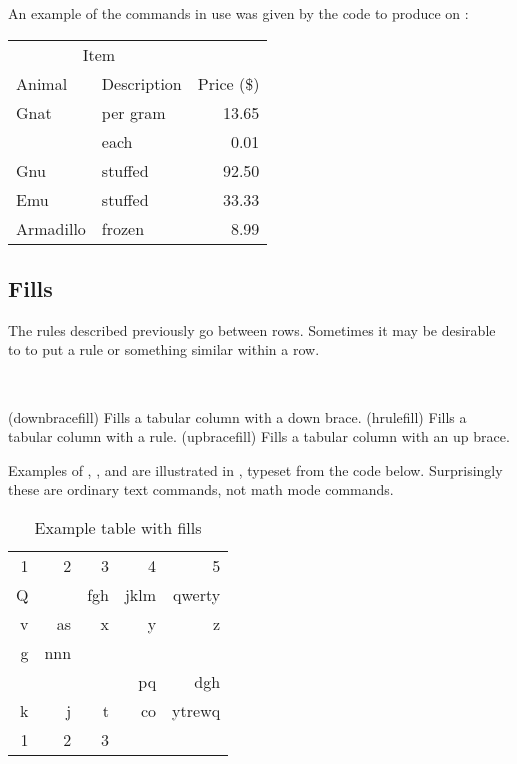  An example of the commands in use was given by the code to
 produce  on :
\begin{lcode}
\begin{tabular}{@{}llr@{}} \toprule
\multicolumn{2}{c}{Item} \\ \cmidrule(r){1-2}
Animal & Description & Price (\$)\\ \midrule
Gnat   & per gram  & 13.65 \\
       & each      & 0.01 \\
Gnu    & stuffed   & 92.50 \\
Emu    & stuffed   & 33.33 \\
Armadillo & frozen & 8.99 \\ \bottomrule
\end{tabular}
\end{lcode}


\subsection{Fills}


    The rules described previously go between rows. Sometimes it may be 
desirable to to put a rule or something similar within a 
row.
    
\begin{syntax}
\cmd{\downbracefill} \cmd{\hrulefill} \cmd{\upbracefill} \\
\end{syntax}
\glossary(downbracefill)%
  {}%
  {Fills a tabular column with a down brace.}
\glossary(hrulefill)%
  {}%
  {Fills a tabular column with a rule.}
\glossary(upbracefill)%
  {}%
  {Fills a tabular column with an up brace.}

Examples of \cmd{\downbracefill}, \cmd{\hrulefill}, and \cmd{\upbracefill}
are illustrated in , typeset from the code below. 
Surprisingly these are
ordinary text commands, not math mode commands.


\begin{lcode}
\begin{table}
\centering
\caption{Example table with fills} \label{tab:fills}
\begin{tabular}{rrrrr}
1 & 2   & 3   & 4    & 5 \\
Q &     & fgh & jklm & qwerty \\
v & as  & x   &    y &      z \\
g & nnn & \multicolumn{3}{c}{\upbracefill} \\
\multicolumn{3}{c}{\downbracefill} & pq & dgh \\
k & j   & t   & co   & ytrewq \\
1 & 2   & 3   & \multicolumn{2}{c}{\hrulefill}
\end{tabular}
\end{table}
\end{lcode}

